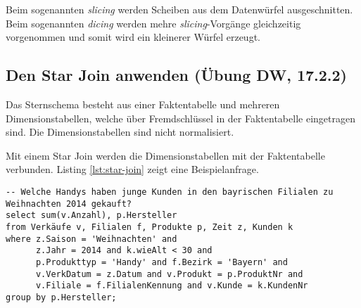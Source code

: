 Beim sogenannten \emph{slicing} werden Scheiben aus dem Datenwürfel ausgeschnitten. Beim sogenannten \emph{dicing} werden mehre \emph{slicing}-Vorgänge gleichzeitig vorgenommen und somit wird ein kleinerer Würfel erzeugt.

\subsection{Den Star Join anwenden (Übung DW, 17.2.2)}

Das Sternschema besteht aus einer Faktentabelle und mehreren Dimensionstabellen, welche über Fremdschlüssel in der Faktentabelle eingetragen sind. Die Dimensionstabellen sind nicht normalisiert.

Mit einem Star Join werden die Dimensionstabellen mit der Faktentabelle verbunden. Listing \ref{lst:star-join} zeigt eine Beispielanfrage.

\begin{lstlisting}[caption={Star Join},label=lst:star-join]
-- Welche Handys haben junge Kunden in den bayrischen Filialen zu Weihnachten 2014 gekauft?
select sum(v.Anzahl), p.Hersteller
from Verkäufe v, Filialen f, Produkte p, Zeit z, Kunden k
where z.Saison = 'Weihnachten' and
	  z.Jahr = 2014 and k.wieAlt < 30 and
	  p.Produkttyp = 'Handy' and f.Bezirk = 'Bayern' and
	  v.VerkDatum = z.Datum and v.Produkt = p.ProduktNr and
	  v.Filiale = f.FilialenKennung and v.Kunde = k.KundenNr
group by p.Hersteller;
\end{lstlisting}